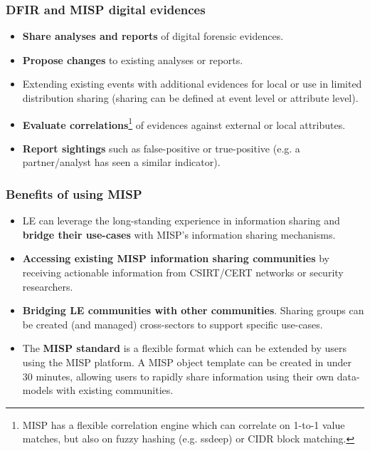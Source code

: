 
\begin{frame}[t,plain]
\titlepage
\end{frame}

\begin{frame}
\frametitle{DFIR and MISP digital evidences}
        \begin{itemize}
                \item {\bf Share analyses and reports} of digital forensic evidences.
                \item {\bf Propose changes} to existing analyses or reports.
                \item Extending existing events with additional evidences for local or use in limited distribution sharing (sharing can be defined at event level or attribute level).
                \item {\bf Evaluate correlations}\footnote{MISP has a flexible correlation engine which can correlate on 1-to-1 value matches, but also on fuzzy hashing (e.g. ssdeep) or CIDR block matching.} of evidences against external or local attributes.
                \item {\bf Report sightings} such as false-positive or true-positive (e.g. a partner/analyst has seen a similar indicator).
        \end{itemize}
\end{frame}

\begin{frame}
\frametitle{Benefits of using MISP}
\begin{itemize}
        \item  LE can leverage the long-standing experience in information sharing and {\bf bridge their use-cases} with MISP's information sharing mechanisms.
        \item {\bf Accessing existing MISP information sharing communities} by receiving actionable information from CSIRT/CERT networks or security researchers.
        \item {\bf Bridging LE communities with other communities}. Sharing groups can be created (and managed) cross-sectors to support specific use-cases.
        \item The {\bf MISP standard} is a flexible format which can be extended by users using the MISP platform. A MISP object template can be created in under 30 minutes, allowing users to rapidly share information using their own data-models with existing communities.
\end{itemize}
\end{frame}

